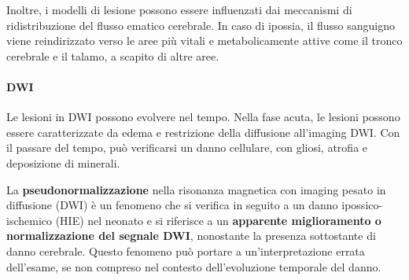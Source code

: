 Inoltre, i modelli di lesione possono essere influenzati dai meccanismi di ridistribuzione del flusso ematico cerebrale. In caso di ipossia, il flusso sanguigno viene reindirizzato verso le aree più vitali e metabolicamente attive come il tronco cerebrale e il talamo, a scapito di altre aree.

\paragraph{DWI} Le lesioni in DWI possono evolvere nel tempo. Nella fase acuta, le lesioni possono essere caratterizzate da edema e restrizione della diffusione all'imaging DWI. Con il passare del tempo, può verificarsi un danno cellulare, con gliosi, atrofia e deposizione di minerali.

La \textbf{pseudonormalizzazione} nella risonanza magnetica con imaging pesato in diffusione (DWI) è un fenomeno che si verifica in seguito a un danno ipossico-ischemico (HIE) nel neonato e si riferisce a un \textbf{apparente miglioramento o normalizzazione del segnale DWI}, nonostante la presenza sottostante di danno cerebrale. Questo fenomeno può portare a un'interpretazione errata dell'esame, se non compreso nel contesto dell'evoluzione temporale del danno.

